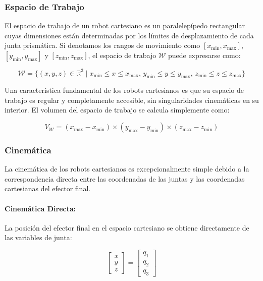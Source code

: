 \subsubsection{Espacio de Trabajo}

El espacio de trabajo de un robot cartesiano es un paralelepípedo rectangular cuyas dimensiones están determinadas por los límites de desplazamiento de cada junta prismática. Si denotamos los rangos de movimiento como $[x_{\min}, x_{\max}]$, $[y_{\min}, y_{\max}]$ y $[z_{\min}, z_{\max}]$, el espacio de trabajo $\mathcal{W}$ puede expresarse como:

\begin{equation}
\mathcal{W} = \{(x, y, z) \in \mathbb{R}^3 \mid x_{\min} \leq x \leq x_{\max}, \, y_{\min} \leq y \leq y_{\max}, \, z_{\min} \leq z \leq z_{\max}\}
\end{equation}

Una característica fundamental de los robots cartesianos es que su espacio de trabajo es regular y completamente accesible, sin singularidades cinemáticas en su interior. El volumen del espacio de trabajo se calcula simplemente como:

\begin{equation}
V_{\mathcal{W}} = (x_{\max} - x_{\min}) \times (y_{\max} - y_{\min}) \times (z_{\max} - z_{\min})
\end{equation}

\subsubsection{Cinemática}

La cinemática de los robots cartesianos es excepcionalmente simple debido a la correspondencia directa entre las coordenadas de las juntas y las coordenadas cartesianas del efector final.

\paragraph{Cinemática Directa:} La posición del efector final en el espacio cartesiano se obtiene directamente de las variables de junta:

\begin{equation}
\begin{bmatrix}
x \\
y \\
z
\end{bmatrix}
=
\begin{bmatrix}
q_1 \\
q_2 \\
q_3
\end{bmatrix}
\end{equation}

